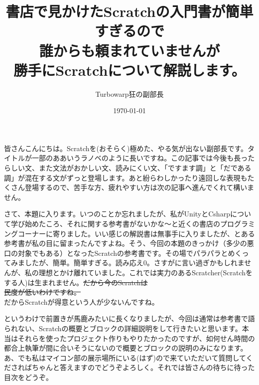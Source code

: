 \documentclass[b5paper,10pt]{jsarticle}
\begin{document}
\title{書店で見かけたScratchの入門書が簡単すぎるので\\誰からも頼まれていませんが\\勝手にScratchについて解説します。}
\author{Turbowarp狂の副部長}
\date{\today}
\maketitle
\thispagestyle{empty}

\begin{multicols*}{3}
  
皆さんこんにちは。Scratchを(おそらく)極めた、やる気が出ない副部長です。タイトルが一部のああいうラノベのように長いですね。この記事では今後も長ったらしい文、また文法がおかしい文、読みにくい文、「ですます調」と「だである調」が混在する文がずっと登場します。あと紛らわしかったり遠回しな表現もたくさん登場するので、苦手な方、疲れやすい方は次の記事へ進んでくれて構いません。

さて、本題に入ります。いつのことか忘れましたが、私がUnityとCsharpについて学び始めたころ、それに関する参考書がないかな～と近くの書店のプログラミングコーナーに寄りました。いい感じの解説書は無事手に入りましたが、とある参考書が私の目に留まったんですよね。そう、今回の本題のきっかけ（多少の悪口の対象でもある）となったScratchの参考書です。その場でパラパラとめくってみましたが、簡単。簡単すぎる。読み応え0。さすがに言い過ぎかもしれませんが、私の理想とかけ離れていました。これでは実力のあるScratcher(Scratchをする人)は生まれません。\sout{だから今のScratchは\\民度が低いわけですね。}\\だからScratchが得意という人が少ないんですね。

というわけで前置きが馬鹿みたいに長くなりましたが、今回は通常は参考書で語られない、Scratchの概要とブロックの詳細説明をして行きたいと思います。本当はそれらを使ったプロジェクト作りもやりたかったのですが、如何せん時間の都合上執筆が間に合いそうにないので概要とブロックの説明のみになります。あ、でも私はマイコン部の展示場所にいる(はず)ので来ていただいて質問してくださればちゃんと答えますのでどうぞよろしく。それでは皆さんの待ちに待った目次をどうぞ。


\end{multicols*}
\end{document}
